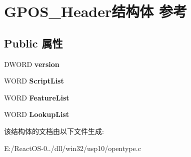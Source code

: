\hypertarget{struct_g_p_o_s___header}{}\section{G\+P\+O\+S\+\_\+\+Header结构体 参考}
\label{struct_g_p_o_s___header}
\subsection*{Public 属性}
\begin{DoxyCompactItemize}
\item 
\mbox{\label{struct_g_p_o_s___header_ad3a9974fa5c9193deb06dd38064f3896}} 
D\+W\+O\+RD {\bfseries version}
\item 
\mbox{\label{struct_g_p_o_s___header_a47d6c5cdf455cddf3b704cb2afbad44f}} 
W\+O\+RD {\bfseries Script\+List}
\item 
\mbox{\label{struct_g_p_o_s___header_a79889ff8e3ac4f2a9c4a2f6ab14b09de}} 
W\+O\+RD {\bfseries Feature\+List}
\item 
\mbox{\label{struct_g_p_o_s___header_a47288e23958f29ce0f9dd2b5e259ebe5}} 
W\+O\+RD {\bfseries Lookup\+List}
\end{DoxyCompactItemize}


该结构体的文档由以下文件生成\+:\begin{DoxyCompactItemize}
\item 
E\+:/\+React\+O\+S-\/0../dll/win32/usp10/opentype.\+c\end{DoxyCompactItemize}
